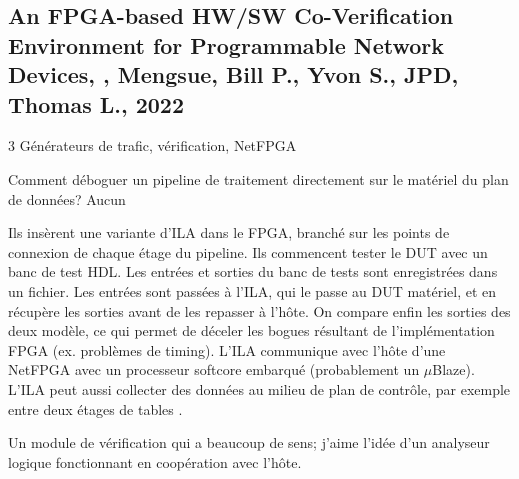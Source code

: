 
\subsection{An FPGA-based HW/SW Co-Verification Environment for Programmable Network Devices, \cite{su_fpga-based_2022}, Mengsue, Bill P., Yvon S., JPD, Thomas L., 2022}

 3
 Générateurs de trafic, vérification, NetFPGA

 Comment déboguer un pipeline de traitement directement sur le matériel du plan de données?
 Aucun

 Ils insèrent une variante d'ILA dans le FPGA, branché sur les points de connexion de chaque étage du pipeline. Ils commencent tester le DUT avec un banc de test HDL. Les entrées et sorties du banc de tests sont enregistrées dans un fichier. Les entrées sont passées à l'ILA, qui le passe au DUT matériel, et en récupère les sorties avant de les repasser à l'hôte. On compare enfin les sorties des deux modèle, ce qui permet de déceler les bogues résultant de l'implémentation FPGA (ex. problèmes de timing). L'ILA communique avec l'hôte d'une NetFPGA avec un processeur softcore embarqué (probablement un $\mu$Blaze). L'ILA peut aussi collecter des données au milieu de plan de contrôle, par exemple entre deux étages de tables .


 Un module de vérification qui a beaucoup de sens; j'aime l'idée d'un analyseur logique fonctionnant en coopération avec l'hôte.

\clearpage
